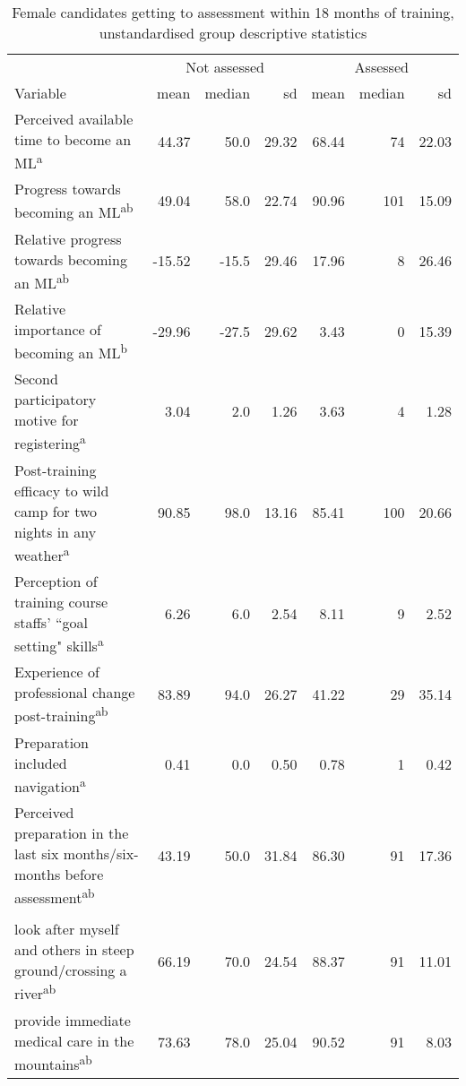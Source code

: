 \documentclass[
  12pt,
  a4paper,
]{book}
\begin{document}
\begin{landscape}
\begin{table}
\caption{\label{tab:female-GTA-18m-combined-summary-stats}Female candidates getting to assessment within 18 months of training, unstandardised group descriptive statistics}
\centering
\begin{tabular}[t]{>{\raggedright\arraybackslash}p{12cm}rrrrrr}
\toprule
\multicolumn{1}{c}{ } & \multicolumn{3}{c}{Not assessed} & \multicolumn{3}{c}{Assessed} \\
\cmidrule(l{3pt}r{3pt}){2-4} \cmidrule(l{3pt}r{3pt}){5-7}
Variable & mean & median & sd & mean & median & sd\\
\midrule
\rowcolor{gray!6}  Perceived available time to become an ML\textsuperscript{a} & 44.37 & 50.0 & 29.32 & 68.44 & 74 & 22.03\\
Progress towards becoming an ML\textsuperscript{ab} & 49.04 & 58.0 & 22.74 & 90.96 & 101 & 15.09\\
\rowcolor{gray!6}  Relative progress towards becoming an ML\textsuperscript{ab} & -15.52 & -15.5 & 29.46 & 17.96 & 8 & 26.46\\
Relative importance of becoming an ML\textsuperscript{b} & -29.96 & -27.5 & 29.62 & 3.43 & 0 & 15.39\\
\rowcolor{gray!6}  Second participatory motive for registering\textsuperscript{a} & 3.04 & 2.0 & 1.26 & 3.63 & 4 & 1.28\\
Post-training efficacy to wild camp for two nights in any weather\textsuperscript{a} & 90.85 & 98.0 & 13.16 & 85.41 & 100 & 20.66\\
\rowcolor{gray!6}  Perception of training course staffs' ``goal setting" skills\textsuperscript{a} & 6.26 & 6.0 & 2.54 & 8.11 & 9 & 2.52\\
Experience of professional change post-training\textsuperscript{ab} & 83.89 & 94.0 & 26.27 & 41.22 & 29 & 35.14\\
\rowcolor{gray!6}  Preparation included navigation\textsuperscript{a} & 0.41 & 0.0 & 0.50 & 0.78 & 1 & 0.42\\
Perceived preparation in the last six months/six-months before assessment\textsuperscript{ab} & 43.19 & 50.0 & 31.84 & 86.30 & 91 & 17.36\\
\rowcolor{gray!6}  \addlinespace[0.3em]
\multicolumn{7}{l}{\textbf{Pre-assessment efficacy to...}}\\
\hspace{1em}look after myself and others in steep ground/crossing a river\textsuperscript{ab} & 66.19 & 70.0 & 24.54 & 88.37 & 91 & 11.01\\
\hspace{1em}provide immediate medical care in the mountains\textsuperscript{ab} & 73.63 & 78.0 & 25.04 & 90.52 & 91 & 8.03\\

\end{tabular}
\end{table}
\end{landscape}
\end{document}
